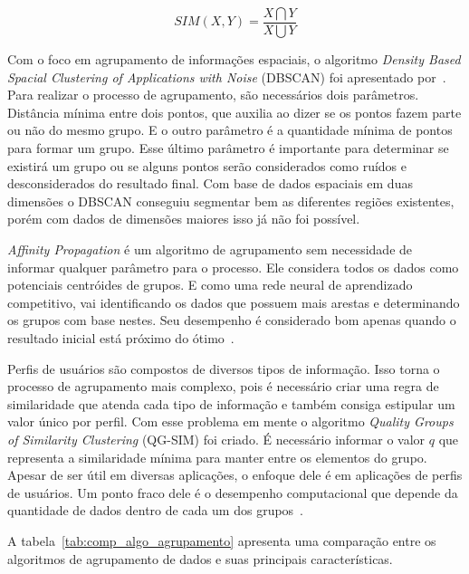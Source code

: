 \begin{equation}
    \label{eq:sim_qrock}
    SIM(X, Y) = \frac{X \bigcap Y}{X \bigcup Y}
\end{equation}

Com o foco em agrupamento de informações espaciais, o algoritmo \emph{Density Based Spacial Clustering of Applications with Noise} (DBSCAN) foi apresentado por~. Para realizar o processo de agrupamento, são necessários dois parâmetros. Distância mínima entre dois pontos, que auxilia ao dizer se os pontos fazem parte ou não do mesmo grupo. E o outro parâmetro é a quantidade mínima de pontos para formar um grupo. Esse último parâmetro é importante para determinar se existirá um grupo ou se alguns pontos serão considerados como ruídos e desconsiderados do resultado final. Com base de dados espaciais em duas dimensões o DBSCAN conseguiu segmentar bem as diferentes regiões existentes, porém com dados de dimensões maiores isso já não foi possível.

\emph{Affinity Propagation} é um algoritmo de agrupamento sem necessidade de informar qualquer parâmetro para o processo. Ele considera todos os dados como potenciais centróides de grupos. E como uma rede neural de aprendizado competitivo, vai identificando os dados que possuem mais arestas e determinando os grupos com base nestes. Seu desempenho é considerado bom apenas quando o resultado inicial está próximo do ótimo~\cite{frey:2007}.

Perfis de usuários são compostos de diversos tipos de informação. Isso torna o processo de agrupamento mais complexo, pois é necessário criar uma regra de similaridade que atenda cada tipo de informação e também consiga estipular um valor único por perfil. Com esse problema em mente o algoritmo \emph{Quality Groups of Similarity Clustering} (QG-SIM) foi criado. É necessário informar o valor $q$ que representa a similaridade mínima para manter entre os elementos do grupo. Apesar de ser útil em diversas aplicações, o enfoque dele é em aplicações de perfis de usuários. Um ponto fraco dele é o desempenho computacional que depende da quantidade de dados dentro de cada um dos grupos~\cite{masiero:2013}.

A tabela~\ref{tab:comp_algo_agrupamento} apresenta uma comparação entre os algoritmos de agrupamento de dados e suas principais características.

